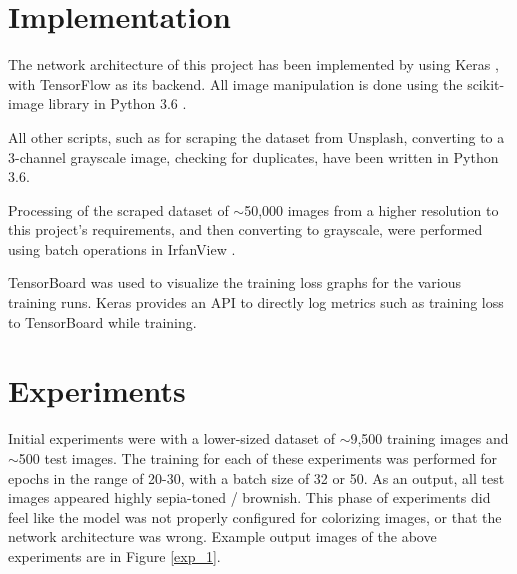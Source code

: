 \documentclass[10pt,twocolumn,letterpaper]{article}
\begin{document}
\section{Implementation}
The network architecture of this project has been implemented by using Keras \cite{Keras}, with TensorFlow \cite{TensorFlow} as its backend. All image manipulation is done using the scikit-image \cite{scikit-image} library in Python 3.6 \cite{Python}.

All other scripts, such as for scraping the dataset from Unsplash, converting to a 3-channel grayscale image, checking for duplicates, have been written in Python 3.6.

Processing of the scraped dataset of $\sim$50,000 images from a higher resolution to this project's requirements, and then converting to grayscale, were performed using batch operations in IrfanView \cite{IrfanView}.

TensorBoard \cite{TensorFlow} was used to visualize the training loss graphs for the various training runs. Keras provides an API to directly log metrics such as training loss to TensorBoard while training.

\section{Experiments}
Initial experiments were with a lower-sized dataset of $\sim$9,500 training images and $\sim$500 test images. The training for each of these experiments was performed for epochs in the range of 20-30, with a batch size of 32 or 50. As an output, all test images appeared highly sepia-toned / brownish. This phase of experiments did feel like the model was not properly configured for colorizing images, or that the network architecture was wrong. Example output images of the above experiments are in Figure \ref{exp_1}.
\end{document}
